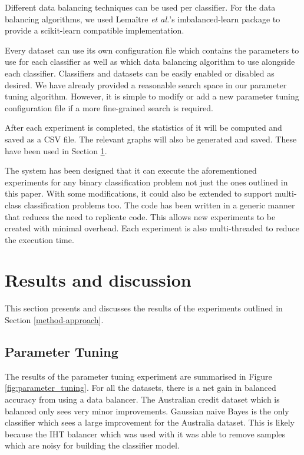 \documentclass{sig-alternate-05-2015}
\begin{document}
	Different data balancing techniques can be used per classifier. For the data balancing algorithms, we used Lema\^{i}tre \textit{et al.}'s \cite{lemaitre2016imbalanced} imbalanced-learn package to provide a scikit-learn compatible implementation.
	
	Every dataset can use its own configuration file which contains the parameters to use for each classifier as well as which data balancing algorithm to use alongside each classifier. Classifiers and datasets can be easily enabled or disabled as desired. We have already provided a reasonable search space in our parameter tuning algorithm. However, it is simple to modify or add a new parameter tuning configuration file if a more fine-grained search is required.
	
	After each experiment is completed, the statistics of it will be computed and saved as a CSV file. The relevant graphs will also be generated and saved. These have been used in Section \ref{results}.
	
	The system has been designed that it can execute the aforementioned experiments for any binary classification problem not just the ones outlined in this paper. With some modifications, it could also be extended to support multi-class classification problems too. The code has been written in a generic manner that reduces the need to replicate code. This allows new experiments to be created with minimal overhead. Each experiment is also multi-threaded to reduce the execution time.
	
	\section{Results and discussion}
	\label{results}
	This section presents and discusses the results of the experiments outlined in Section \ref{method-approach}.
	\subsection{Parameter Tuning}
	The results of the parameter tuning experiment are summarised in Figure \ref{fig:parameter_tuning}. For all the datasets, there is a net gain in balanced accuracy from using a data balancer. The Australian credit dataset which is balanced only sees very minor improvements. Gaussian naive Bayes is the only classifier which sees a large improvement for the Australia dataset. This is likely because the IHT balancer which was used with it was able to remove samples which are noisy for building the classifier model. 
	
\end{document}

